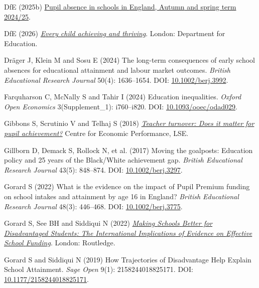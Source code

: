 \documentclass[
  11pt,
]{article}
\newlength{\cslhangindent}
\newenvironment{CSLReferences}[2] %
 {\begin{list}{}{%
  \setlength{\itemindent}{0pt}
  \setlength{\leftmargin}{0pt}
  \setlength{\parsep}{0pt}
  \ifodd #1
   \setlength{\leftmargin}{\cslhangindent}
   \setlength{\itemindent}{-1\cslhangindent}
  \fi
  \setlength{\itemsep}{#2\baselineskip}}}
 {\end{list}}
\begin{document}
\begin{CSLReferences}{1}{1}
DfE (2025b)
\href{https://explore-education-statistics.service.gov.uk/find-statistics/pupil-absence-in-schools-in-england/2024-25-autumn-and-spring-term}{Pupil
absence in schools in {England}, {Autumn} and spring term 2024/25}.

DfE (2026)
\emph{\href{https://www.gov.uk/government/publications/every-child-achieving-and-thriving/every-child-achieving-and-thriving-html-version}{Every
child achieving and thriving}}. London: Department for Education.

Dräger J, Klein M and Sosu E (2024) The long-term consequences of early
school absences for educational attainment and labour market outcomes.
\emph{British Educational Research Journal} 50(4): 1636--1654. DOI:
\href{https://doi.org/10.1002/berj.3992}{10.1002/berj.3992}.

Farquharson C, McNally S and Tahir I (2024) Education inequalities.
\emph{Oxford Open Economics} 3(Supplement\_1): i760--i820. DOI:
\href{https://doi.org/10.1093/ooec/odad029}{10.1093/ooec/odad029}.

Gibbons S, Scrutinio V and Telhaj S (2018)
\emph{\href{https://cep.lse.ac.uk/_new/publications/abstract.asp?index=5752}{Teacher
turnover: Does it matter for pupil achievement?}} Centre for Economic
Performance, LSE.

Gillborn D, Demack S, Rollock N, et al. (2017) Moving the goalposts:
{Education} policy and 25 years of the {Black}/{White} achievement gap.
\emph{British Educational Research Journal} 43(5): 848--874. DOI:
\href{https://doi.org/10.1002/berj.3297}{10.1002/berj.3297}.

Gorard S (2022) What is the evidence on the impact of {Pupil} {Premium}
funding on school intakes and attainment by age 16 in {England}?
\emph{British Educational Research Journal} 48(3): 446--468. DOI:
\href{https://doi.org/10.1002/berj.3775}{10.1002/berj.3775}.

Gorard S, See BH and Siddiqui N (2022)
\emph{\href{https://doi.org/10.4324/9781003287353}{Making {Schools}
{Better} for {Disadvantaged} {Students}: {The} {International}
{Implications} of {Evidence} on {Effective} {School} {Funding}}}.
London: Routledge.

Gorard S and Siddiqui N (2019) How {Trajectories} of {Disadvantage}
{Help} {Explain} {School} {Attainment}. \emph{Sage Open} 9(1):
2158244018825171. DOI:
\href{https://doi.org/10.1177/2158244018825171}{10.1177/2158244018825171}.


\end{CSLReferences}
\end{document}
